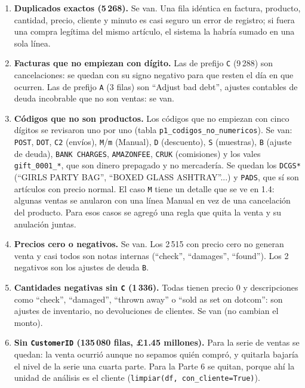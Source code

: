 \documentclass[11pt]{article}
\begin{document}
\begin{enumerate}[label=(\alph*)]
\item \textbf{Duplicados exactos (5\,268).} Se van. Una fila idéntica en factura, producto, cantidad, precio, cliente y minuto es casi seguro un error de registro; si fuera una compra legítima del mismo artículo, el sistema la habría sumado en una sola línea.
\item \textbf{Facturas que no empiezan con dígito.} Las de prefijo \texttt{C} (9\,288) son cancelaciones: se quedan con su signo negativo para que resten el día en que ocurren. Las de prefijo \texttt{A} (3 filas) son ``Adjust bad debt'', ajustes contables de deuda incobrable que no son ventas: se van.
\item \textbf{Códigos que no son productos.} Los códigos que no empiezan con cinco dígitos se revisaron uno por uno (tabla \texttt{p1\_codigos\_no\_numericos}). Se van: \texttt{POST}, \texttt{DOT}, \texttt{C2} (envíos), \texttt{M}/\texttt{m} (Manual), \texttt{D} (descuento), \texttt{S} (muestras), \texttt{B} (ajuste de deuda), \texttt{BANK CHARGES}, \texttt{AMAZONFEE}, \texttt{CRUK} (comisiones) y los vales \texttt{gift\_0001\_*}, que son dinero prepagado y no mercadería. Se quedan los \texttt{DCGS*} (``GIRLS PARTY BAG'', ``BOXED GLASS ASHTRAY''...) y \texttt{PADS}, que sí son artículos con precio normal. El caso \texttt{M} tiene un detalle que se ve en 1.4: algunas ventas se anularon con una línea Manual en vez de una cancelación del producto. Para esos casos se agregó una regla que quita la venta y su anulación juntas.
\item \textbf{Precios cero o negativos.} Se van. Los 2\,515 con precio cero no generan venta y casi todos son notas internas (``check'', ``damages'', ``found''). Los 2 negativos son los ajustes de deuda \texttt{B}.
\item \textbf{Cantidades negativas sin \texttt{C} (1\,336).} Todas tienen precio 0 y descripciones como ``check'', ``damaged'', ``thrown away'' o ``sold as set on dotcom'': son ajustes de inventario, no devoluciones de clientes. Se van (no cambian el monto).
\item \textbf{Sin \texttt{CustomerID} (135\,080 filas, £1.45 millones).} Para la serie de ventas se quedan: la venta ocurrió aunque no sepamos quién compró, y quitarla bajaría el nivel de la serie una cuarta parte. Para la Parte 6 se quitan, porque ahí la unidad de análisis es el cliente (\texttt{limpiar(df, con\_cliente=True)}).
\end{enumerate}
\end{document}
